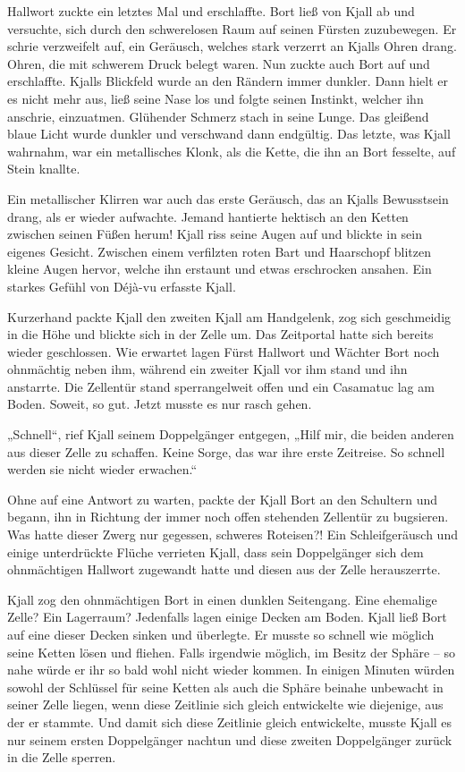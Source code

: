 \documentclass[10pt, a4paper, oneside]{book}
\begin{document}
Hallwort zuckte ein letztes Mal und erschlaffte. Bort ließ von Kjall ab und versuchte, sich durch den schwerelosen Raum auf seinen Fürsten zuzubewegen. Er schrie verzweifelt auf, ein Geräusch, welches stark verzerrt an Kjalls Ohren drang. Ohren, die mit schwerem Druck belegt waren. Nun zuckte auch Bort auf und erschlaffte. Kjalls Blickfeld wurde an den Rändern immer dunkler. Dann hielt er es nicht mehr aus, ließ seine Nase los und folgte seinen Instinkt, welcher ihn anschrie, einzuatmen. Glühender Schmerz stach in seine Lunge. Das gleißend blaue Licht wurde dunkler und verschwand dann endgültig. Das letzte, was Kjall wahrnahm, war ein metallisches Klonk, als die Kette, die ihn an Bort fesselte, auf Stein knallte.\bigskip



Ein metallischer Klirren war auch das erste Geräusch, das an Kjalls Bewusstsein drang, als er wieder aufwachte. Jemand hantierte hektisch an den Ketten zwischen seinen Füßen herum! Kjall riss seine Augen auf und blickte in sein eigenes Gesicht. Zwischen einem verfilzten roten Bart und Haarschopf blitzen kleine Augen hervor, welche ihn erstaunt und etwas erschrocken ansahen. Ein starkes Gefühl von Déjà-vu erfasste Kjall.

Kurzerhand packte Kjall den zweiten Kjall am Handgelenk, zog sich geschmeidig in die Höhe und blickte sich in der Zelle um. Das Zeitportal hatte sich bereits wieder geschlossen. Wie erwartet lagen Fürst Hallwort und Wächter Bort noch ohnmächtig neben ihm, während ein zweiter Kjall vor ihm stand und ihn anstarrte. Die Zellentür stand sperrangelweit offen und ein Casamatuc lag am Boden. Soweit, so gut. Jetzt musste es nur rasch gehen.

„Schnell“, rief Kjall seinem Doppelgänger entgegen, „Hilf mir, die beiden anderen aus dieser Zelle zu schaffen. Keine Sorge, das war ihre erste Zeitreise. So schnell werden sie nicht wieder erwachen.“

Ohne auf eine Antwort zu warten, packte der Kjall Bort an den Schultern und begann, ihn in Richtung der immer noch offen stehenden Zellentür zu bugsieren. Was hatte dieser Zwerg nur gegessen, schweres Roteisen?! Ein Schleifgeräusch und einige unterdrückte Flüche verrieten Kjall, dass sein Doppelgänger sich dem ohnmächtigen Hallwort zugewandt hatte und diesen aus der Zelle herauszerrte.

Kjall zog den ohnmächtigen Bort in einen dunklen Seitengang. Eine ehemalige Zelle? Ein Lagerraum? Jedenfalls lagen einige Decken am Boden. Kjall ließ Bort auf eine dieser Decken sinken und überlegte. Er musste so schnell wie möglich seine Ketten lösen und fliehen. Falls irgendwie möglich, im Besitz der Sphäre – so nahe würde er ihr so bald wohl nicht wieder kommen. In einigen Minuten würden sowohl der Schlüssel für seine Ketten als auch die Sphäre beinahe unbewacht in seiner Zelle liegen, wenn diese Zeitlinie sich gleich entwickelte wie diejenige, aus der er stammte. Und damit sich diese Zeitlinie gleich entwickelte, musste Kjall es nur seinem ersten Doppelgänger nachtun und diese zweiten Doppelgänger zurück in die Zelle sperren.
\end{document}
